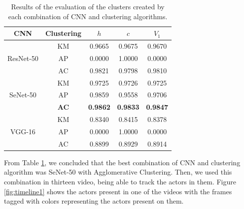 \begin{table}[!ht]
\centering
\small
\caption{Results of the evaluation of the clusters created by each combination of CNN and clustering algorithms.}
\begin{tabular}{@{}ccccc@{}}
\toprule
\textbf{CNN} & \textbf{Clustering} & \textbf{$h$} & \textbf{$c$} & \textbf{$V_1$} \\ \midrule
                  & KM                  & 0.9665                     & 0.9675                      & 0.9670             \\
ResNet-50         & AP                  & 0.0000                     & 1.0000                      & 0.0000             \\
                  & AC                  & 0.9821                     & 0.9798                      & 0.9810             \\ \midrule
                  & KM                  & 0.9725                     & 0.9726                      & 0.9725             \\
SeNet-50          & AP                  & 0.9859                     & 0.9558                      & 0.9706             \\
                  & \textbf{AC}         & \textbf{0.9862}            & \textbf{0.9833}             & \textbf{0.9847}    \\ \midrule
                  & KM                  & 0.8340                     & 0.8415                      & 0.8378             \\
VGG-16            & AP                  & 0.0000                     & 1.0000                      & 0.0000             \\
                  & AC                  & 0.8899                     & 0.8929                      & 0.8914             \\
\end{tabular}
\label{tab:results_clustering}
\vspace{-1em}
\end{table}

From Table \ref{tab:results_clustering}, we concluded that the best combination of CNN and clustering algorithm was SeNet-50 with Agglomerative Clustering. Then, we used this combination in thirteen video, being able to track the actors in them. Figure \ref{fig:timeline1} shows the actors present in one of the videos with the frames tagged with colors representing the actors present on them.


